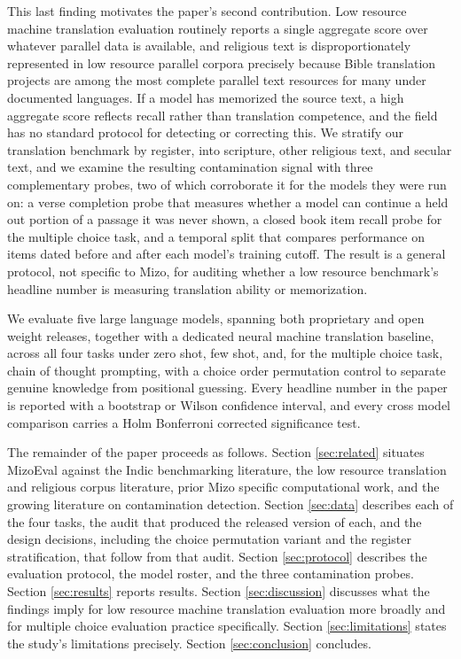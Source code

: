 \documentclass[11pt,a4paper]{article}
\begin{document}
This last finding motivates the paper's second contribution. Low resource machine translation evaluation routinely reports a single aggregate score over whatever parallel data is available, and religious text is disproportionately represented in low resource parallel corpora precisely because Bible translation projects are among the most complete parallel text resources for many under documented languages. If a model has memorized the source text, a high aggregate score reflects recall rather than translation competence, and the field has no standard protocol for detecting or correcting this. We stratify our translation benchmark by register, into scripture, other religious text, and secular text, and we examine the resulting contamination signal with three complementary probes, two of which corroborate it for the models they were run on: a verse completion probe that measures whether a model can continue a held out portion of a passage it was never shown, a closed book item recall probe for the multiple choice task, and a temporal split that compares performance on items dated before and after each model's training cutoff. The result is a general protocol, not specific to Mizo, for auditing whether a low resource benchmark's headline number is measuring translation ability or memorization.

We evaluate five large language models, spanning both proprietary and open weight releases, together with a dedicated neural machine translation baseline, across all four tasks under zero shot, few shot, and, for the multiple choice task, chain of thought prompting, with a choice order permutation control to separate genuine knowledge from positional guessing. Every headline number in the paper is reported with a bootstrap or Wilson confidence interval, and every cross model comparison carries a Holm Bonferroni corrected significance test.

The remainder of the paper proceeds as follows. Section \ref{sec:related} situates MizoEval against the Indic benchmarking literature, the low resource translation and religious corpus literature, prior Mizo specific computational work, and the growing literature on contamination detection. Section \ref{sec:data} describes each of the four tasks, the audit that produced the released version of each, and the design decisions, including the choice permutation variant and the register stratification, that follow from that audit. Section \ref{sec:protocol} describes the evaluation protocol, the model roster, and the three contamination probes. Section \ref{sec:results} reports results. Section \ref{sec:discussion} discusses what the findings imply for low resource machine translation evaluation more broadly and for multiple choice evaluation practice specifically. Section \ref{sec:limitations} states the study's limitations precisely. Section \ref{sec:conclusion} concludes.
\end{document}
